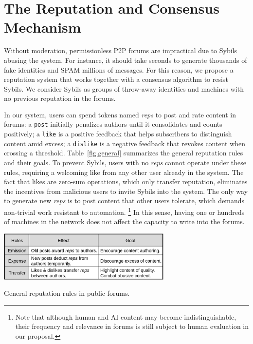 \documentclass[12pt]{article}
\newcommand{\reps}     {\emph{reps}\xspace}
\newcommand{\code}[1]  {\texttt{\footnotesize{#1}}}
\begin{document}
\section{The Reputation and Consensus Mechanism}
\label{sec.design}

Without moderation, permissionless P2P forums are impractical
due to Sybils abusing the system.
For instance, it should take seconds to generate thousands of fake
identities and SPAM millions of messages.
For this reason, we propose a reputation system that works together with a
consensus algorithm to resist Sybils.
We consider Sybils as groups of throw-away identities and machines with no
previous reputation in the forums.

In our system, users can spend tokens named \reps to post and rate content in
forums:
a \code{post} initially penalizes authors until it consolidates and counts
positively;
a \code{like} is a positive feedback that helps subscribers to distinguish
content amid excess;
a \code{dislike} is a negative feedback that revokes content when crossing a
threshold.
Table~\ref{fig.general} summarizes the general reputation rules and their
goals.
To prevent Sybils, users with no \reps cannot operate under these rules,
requiring a welcoming like from any other user already in the system.
The fact that likes are zero-sum operations, which only transfer reputation,
eliminates the incentives from malicious users to invite Sybils into the
system.
The only way to generate new \reps is to post content that other users
tolerate, which demands non-trivial work resistant to automation.%
\footnote{
    Note that although human and AI content may become indistinguishable, their
    frequency and relevance in forums is still subject to human evaluation in
    our proposal.
}
In this sense, having one or hundreds of machines in the network does not
affect the capacity to write into the forums.

\begin{table}
\centering
\includegraphics[width=0.65\textwidth]{general.png}
\caption{General reputation rules in public forums.}
\label{fig.general}
\end{table}
\end{document}
